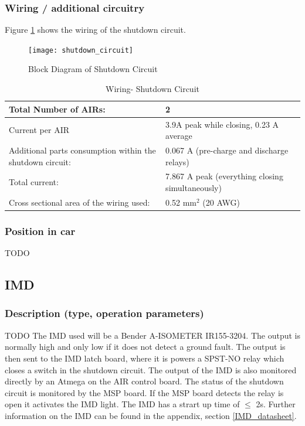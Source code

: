 \documentclass{article}
\begin{document}
\subsubsection{Wiring / additional circuitry}
	Figure \ref{shutdown_circuit} shows the wiring of the shutdown circuit.

	\begin{figure}
        \texttt{[image: shutdown\_circuit]}
        \caption{Block Diagram of Shutdown Circuit}
        \label{shutdown_circuit}
    \end{figure}

	\begin{table}[H]
        \centering
        \begin{tabular}{|l|l|}
        \hline
            Total Number of AIRs: & 2 \\ \hline
            Current per AIR & 3.9A peak while closing, 0.23 A average\\ \hline
            Additional parts consumption within the shutdown circuit: & 0.067 A (pre-charge and discharge relays)  \\ \hline
            Total current: & 7.867 A peak (everything closing simultaneously) \\ \hline
            Cross sectional area of the wiring used: & 0.52 mm$^2$ (20 AWG) \\ \hline
        \end{tabular}
        \caption{Wiring- Shutdown Circuit}
        \label{ShutdownCircuitTable}
    \end{table}

\subsubsection{Position in car}
TODO







\subsection{IMD}\label{imd}
\subsubsection{Description (type, operation parameters)}TODO
The IMD used will be a Bender A-ISOMETER IR155-3204. The output is normally high and only low if it does not detect a ground fault. The output is then sent to the IMD latch board, where it is powers a SPST-NO relay which closes a switch in the shutdown circuit. The output of the IMD is also monitored directly by an Atmega on the AIR control board. The status of the shutdown circuit is monitored by the MSP board. If the MSP board detects the relay is  open it activates the IMD light. The IMD has a strart up time of $\leq$ 2s. Further information on the IMD can be found in the appendix, section \ref{IMD_datasheet}.
\end{document}
